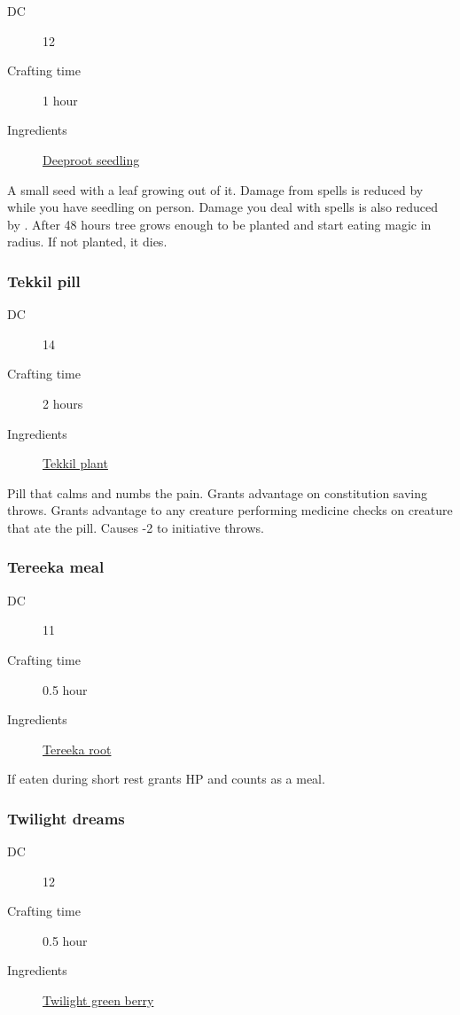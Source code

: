 \begin{description}
\item [DC] 12
\item [Crafting time] 1 hour
\item [Ingredients] \hyperref[Sussur]{Deeproot seedling}
\end{description}

A small seed with a leaf growing out of it. 
Damage from spells is reduced by  while you have seedling on person. 
Damage you deal with spells is also reduced by . 
After 48 hours tree grows enough to be planted and start eating magic in radius. 
If not planted, it dies.

\subsubsection{Tekkil pill}
\label{Tekkil pill}

\begin{description}
\item [DC] 14
\item [Crafting time] 2 hours
\item [Ingredients] \hyperref[Tekkil]{Tekkil plant}
\end{description}

Pill that calms and numbs the pain. Grants advantage on constitution saving throws. 
Grants advantage to any creature performing medicine checks on creature that ate the pill. 
Causes -2 to initiative throws.

\subsubsection{Tereeka meal}
\label{Tereeka meal}

\begin{description}
\item [DC] 11
\item [Crafting time] 0.5 hour
\item [Ingredients] \hyperref[Tereeka Root]{Tereeka root}
\end{description}

If eaten during short rest grants  HP and counts as a meal.

\subsubsection{Twilight dreams}
\label{Twilight dreams}

\begin{description}
\item [DC] 12
\item [Crafting time] 0.5 hour
\item [Ingredients] \hyperref[Twilight Green]{Twilight green berry}
\end{description}

